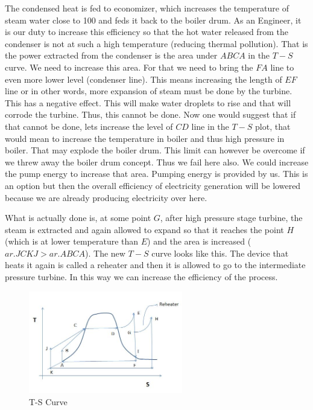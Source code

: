 \documentclass{report}
\begin{document}
\par The condensed heat is fed to economizer, which increases the temperature of steam water close to 100 and feds it back to the boiler drum. As an Engineer, it is our duty to increase this efficiency so that the hot water released from the condenser is not at such a high temperature (reducing thermal pollution). That is the power extracted from the condenser is the area under $ABCA$ in the $T-S$ curve. We need to increase this area. For that we need to bring the $FA$ line to even more lower level (condenser line). This means increasing the length of $EF$ line or in other words,  more expansion of steam must be done by the turbine. This has a negative effect. This will make water droplets to rise and that will corrode the turbine. Thus, this cannot be done. Now one would suggest that if that cannot be done, lets increase the level of $CD$ line in the $T-S$ plot, that would mean to increase the temperature in boiler and thus high pressure in boiler. That may explode the boiler drum.  This limit can however be overcome if we threw away the boiler drum concept. Thus we fail here also. We could increase the pump energy to increase that area. Pumping energy is provided by us. This is an option but then the overall efficiency of electricity generation will be lowered because we are already producing electricity over here.

\par What is actually done is, at some point $G$, after high pressure stage turbine, the steam is extracted and again allowed to expand so that it reaches the point $H$ (which is at lower temperature than $E$) and the area is increased ($ar. JCKJ > ar. ABCA$). The new $T-S$ curve looks like this. The device that heats it again is called a reheater and then it is allowed to go to the intermediate pressure turbine. In this way we can increase the efficiency of the process.
\\ 
\begin{figure}[H]
\centering \includegraphics[width=0.6\textwidth]{captures/Capture3.JPG}
\caption{T-S Curve}
\end{figure}
\end{document}
